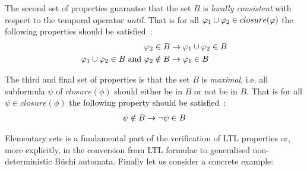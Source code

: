 The second set of properties guarantee that the set $B$ is \emph{locally consistent} with respect to the temporal operator \emph{until}. That is for all $\varphi_1 \cup \varphi_2 \in closure(\varphi)$ the following properties should be satisfied~\cite[Fig.~5.20]{baier2008principles}:
\begin{align}
    \varphi_2 \in B &\rightarrow \varphi_1 \cup \varphi_2 \in B \label{eq:elem2.1} \\
    \varphi_1 \cup \varphi_2 \in B \text{ and } \varphi_2 \notin B &\rightarrow \varphi_1 \in B \label{eq:elem2.2}
\end{align}

The third and final set of properties is that the set $B$ is \emph{maximal}, i.e. all subformula $\psi$ of $closure(\phi)$ should either be in $B$ or not be in $B$. That is for all $\psi \in closure(\phi)$ the following property should be satisfied~\cite[Fig.~5.20]{baier2008principles}:
\begin{align}
    \psi \notin B \rightarrow \lnot \psi \in B \label{eq:elem3.1}
\end{align}

Elementary sets is a fundamental part of the verification of LTL properties or, more explicitly, in the conversion from LTL formulae to generalised non-deterministic Büchi automata. Finally let us consider a concrete example:

